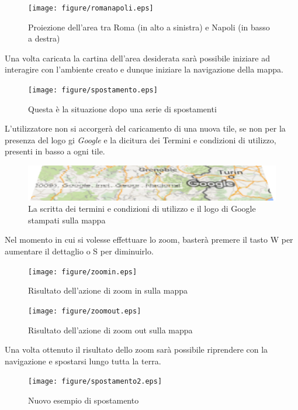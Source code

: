 \begin{figure}[H]
	\centering
	\texttt{[image: figure/romanapoli.eps]}
	\caption{Proiezione dell'area tra Roma (in alto a sinistra) e Napoli (in basso a destra)}
\end{figure}

Una volta caricata la cartina dell'area desiderata sarà possibile iniziare ad interagire con l'ambiente creato e dunque iniziare la navigazione della mappa.

\begin{figure}[H]
	\centering
	\texttt{[image: figure/spostamento.eps]}
	\caption{Questa è la situazione dopo una serie di spostamenti}
\end{figure}

L'utilizzatore non si accorgerà del caricamento di una nuova tile, se non per la presenza del logo gi \textit{Google} e la dicitura dei Termini e condizioni di utilizzo, presenti in basso a ogni tile.

\begin{figure}[H]
	\centering
	\includegraphics[width=\textwidth]{figure/terminiecondizioni.eps}
	\caption{La scritta dei termini e condizioni di utilizzo e il logo di Google stampati sulla mappa}
\end{figure}

Nel momento in cui si volesse effettuare lo zoom, basterà premere il tasto W per aumentare il dettaglio o S per diminuirlo.

\begin{figure}[H]
	\centering
	\texttt{[image: figure/zoomin.eps]}
	\caption{Risultato dell'azione di zoom in sulla mappa}
\end{figure}

\begin{figure}[H]
	\centering
	\texttt{[image: figure/zoomout.eps]}
	\caption{Risultato dell'azione di zoom out sulla mappa}
\end{figure}

Una volta ottenuto il risultato dello zoom sarà possibile riprendere con la navigazione e spostarsi lungo tutta la terra.

\begin{figure}[H]
	\centering
	\texttt{[image: figure/spostamento2.eps]}
	\caption{Nuovo esempio di spostamento}
\end{figure}